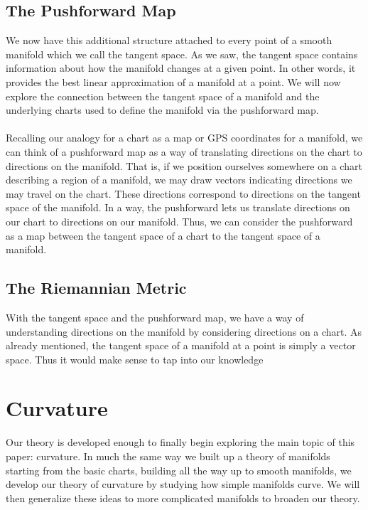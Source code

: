 \documentclass[]{article}
\newcommand\<{\ensuremath{\left\langle}}
\renewcommand\>{\ensuremath{\right\rangle}}
\theoremstyle{definition}
\theoremstyle{definition}
\begin{document}
	\subsection*{The Pushforward Map}
	We now have this additional structure attached to every point of a smooth manifold which we call the tangent space. As we saw, the tangent space contains information about how the manifold changes at a given point. In other words, it provides the best linear approximation of a manifold at a point. We will now explore the connection between the tangent space of a manifold and the underlying charts used to define the manifold via the pushforward map. \\
	\\
	Recalling our analogy for a chart as a map or GPS coordinates for a manifold, we can think of a pushforward map as a way of translating directions on the chart to directions on the manifold. That is, if we position ourselves somewhere on a chart describing a region of a manifold, we may draw vectors indicating directions we may travel on the chart. These directions correspond to directions on the tangent space of the manifold. In a way, the pushforward lets us translate directions on our chart to directions on our manifold. Thus, we can consider the pushforward as a map between the tangent space of a chart to the tangent space of a manifold.
	
	\subsection*{The Riemannian Metric}
	With the tangent space and the pushforward map, we have a way of understanding directions on the manifold by considering directions on a chart. As already mentioned, the tangent space of a manifold at a point is simply a vector space. Thus it would make sense to tap into our knowledge 
	
	
	
	\newpage
	\section{Curvature}
	Our theory is developed enough to finally begin exploring the main topic of this paper: curvature. In much the same way we built up a theory of manifolds starting from the basic charts, building all the way up to smooth manifolds, we develop our theory of curvature by studying how simple manifolds curve. We will then generalize these ideas to more complicated manifolds to broaden our theory. 
	
\end{document}
